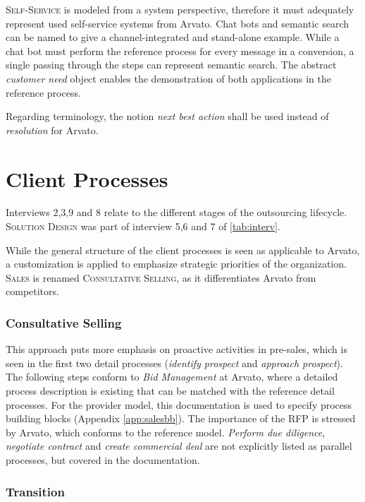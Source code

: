 	\textsc{Self-Service} is modeled from a system perspective, therefore it must adequately represent used self-service systems from Arvato. Chat bots and semantic search can be named to give a channel-integrated and stand-alone example. While a chat bot must perform the reference process for every message in a conversion, a single passing through the steps can represent semantic search. The abstract \textit{customer need}  object enables the demonstration of both applications in the reference process.   

	Regarding terminology, the notion \textit{next best action} shall be used instead of \textit{resolution} for Arvato. 
	\section{Client Processes}
	Interviews 2,3,9 and 8 relate to the different stages of the outsourcing lifecycle. \textsc{Solution Design} was part of interview 5,6 and 7 of \Tab \ref{tab:interv}.
	
	While the general structure of the client processes is seen as applicable to Arvato, a customization is applied to emphasize strategic priorities of the organization. \textsc{Sales} is renamed \textsc{Consultative Selling}, as it differentiates Arvato from competitors. 
	
	\subsubsection{Consultative Selling}
	
	This approach puts more emphasis on proactive activities in pre-sales, which is seen in the first two detail processes (\textit{identify prospect} and \textit{approach prospect}). The following steps conform to \textit{Bid Management} at Arvato, where a detailed process description is existing that can be matched with the reference detail processes. For the provider model, this documentation is used to specify process building blocks (\cf Appendix \ref{app:salesbb}). 	The importance of the  \acrshort{RFP} is stressed by Arvato, which conforms to the reference model. \textit{Perform due diligence}, \textit{negotiate contract} and \textit{create commercial deal} are not explicitly listed as parallel processes, but covered in the documentation. %
	
	\subsubsection{Transition}
	
